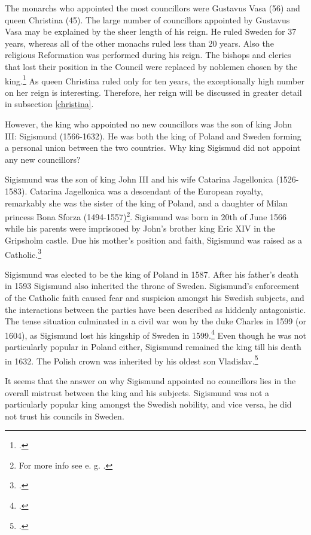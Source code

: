 The monarchs who appointed the most councillors were Gustavus Vasa (56) and queen Christina (45). The large number of councillors appointed by Gustavus Vasa may be explained by the sheer length of his reign. He ruled Sweden for 37 years, whereas all of the other monachs ruled less than 20 years. Also the religious Reformation was performed during his reign. The bishops and clerics that lost their position in the Council were replaced by noblemen chosen by the king.\footcite[TODO]{pSuurvalta} As queen Christina ruled only for ten years, the exceptionally high number on her reign is interesting. Therefore, her reign will be discussed in greater detail in subsection \ref{christina}. 

However, the king who appointed no new councillors was the son of king John III: Sigismund (1566-1632). He was both the king of Poland and Sweden forming a personal union between the two countries. Why king Sigismud did not appoint any new councillors? 

Sigismund was the son of king John III and his wife Catarina Jagellonica (1526-1583). Catarina Jagellonica was a descendant of the European royalty, remarkably she was the sister of the king of Poland, and a daughter of Milan princess Bona Sforza (1494-1557)\footnote{For more info see e. g. \cite{bona_sforza}.}. Sigismund was born in 20th of June 1566 while his parents were imprisoned by John's brother king Eric XIV in the Gripsholm castle. Due his mother's position and faith, Sigismund was raised as a Catholic.\footcite[p. 27, 47.]{lappalainen09}

Sigismund was elected to be the king of Poland in 1587. After his father's death in 1593 Sigismund also inherited the throne of Sweden. Sigismund's enforcement of the Catholic faith caused fear and suspicion amongst his Swedish subjects, and the interactions between the parties have been described as hiddenly antagonistic. The tense situation culminated in a civil war won by the duke Charles in 1599 (or 1604), as Sigismund lost his kingship of Sweden in 1599.\footcites[pp. 49-52, 78-81, 100-111, 259-267.]{lappalainen09}{sbl_sigismund} Even though he was not particularly popular in Poland either, Sigismund remained the king till his death in 1632. The Polish crown was inherited by his oldest son Vladislav.\footcite{sbl_sigismund}

It seems that the answer on why Sigismund appointed no councillors lies in the overall mistrust between the king and his subjects. Sigismund was not a particularly popular king amongst the Swedish nobility, and vice versa, he did not trust his councils in Sweden. 

